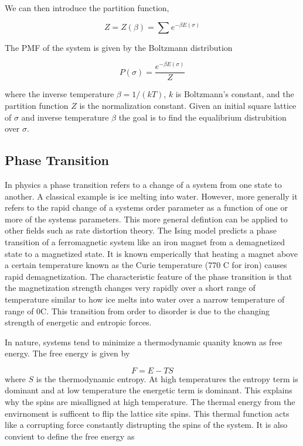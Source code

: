 \documentclass{article}
\begin{document}
We can then introduce the partition function, 

\begin{equation}
    Z = Z(\beta) = \sum e^{-\beta E(\sigma)}
\end{equation}

The PMF of the system is given by the Boltzmann distribution

\begin{equation}
    P(\sigma) = \frac{e^{-\beta E(\sigma)}}{Z}
\end{equation}

where the inverse temperature $\beta = 1/(kT)$, $k$ is Boltzmann's constant, and the partition function $Z$ is the normalization constant.
Given an initial square lattice of $\sigma$ and inverse temperature $\beta$ the goal is to find the equalibrium distrubition over $\sigma$.


\subsection{Phase Transition}
In physics a phase transition refers to a change of a system from one state to another. A classical example is ice melting into water.
However, more generally it refers to the rapid change of a systems order parameter as a function of one or more of the systems parameters. 
This more general defintion can be applied to other fields such as rate distortion theory. The Ising model predicts a phase transition of a ferromagnetic system like an iron magnet from a demagnetized state to a magnetized state. 
It is known emperically that heating a magnet above a certain temperature known as the Curie temperature (770 \degree C for iron) causes rapid
demagnetization. The characteristic feature of the phase transition is that the magnetization strength changes very rapidly over a short range of temperature
similar to how ice melts into water over a narrow temperature of range of 0\degree C. This transition from order to disorder is due to the changing strength of
energetic and entropic forces.

In nature, systems tend to minimize a thermodynamic quanity known as free energy. The free energy is given by

\begin{equation}\label{eq:eq1}
    F = E - TS
\end{equation}
where $S$ is the thermodynamic entropy. At high temperatures the entropy term is dominant and at low temperature the energetic term is dominant.
This explains why the spins are misalligned at high temperature. The thermal energy from the envirnoment is sufficent to flip the lattice site spins.
This thermal function acts like a corrupting force constantly distrupting the spins of the system. It is also convient to define the free energy as
\end{document}
